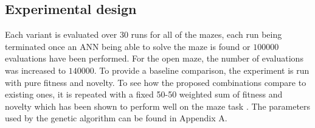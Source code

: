 \subsection{Experimental design}
\label{subsection:design}
Each variant is evaluated over $30$ runs for all of the mazes, each run being terminated once an ANN
being able to solve the maze is found or $100 000$ evaluations have been performed. For the open maze, the number of
evaluations was increased to $140 000$.
To provide a baseline comparison, the experiment is run with pure fitness and novelty. To see how
the proposed combinations compare to existing ones, it is repeated with a fixed 50-50 weighted sum
of fitness and novelty which has been shown to perform well on the maze task \cite{ns_study}.
The parameters used by the genetic algorithm can be found in Appendix A.
